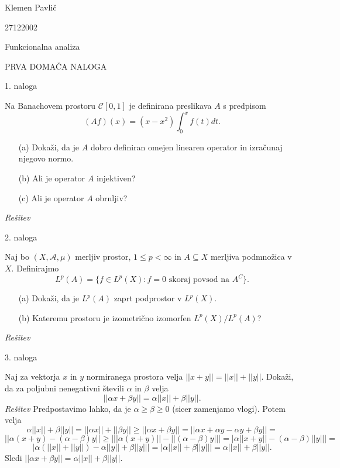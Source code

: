 \documentclass[a4paper, 12pt]{article}
\begin{document}
\begin{flushright}
Klemen Pavlič

27122002
\end{flushright}
\begin{center}
Funkcionalna analiza
\end{center}
\begin{center}
PRVA DOMAČA NALOGA
\end{center}

\begin{flushleft}
1. naloga
\end{flushleft}
Na Banachovem prostoru $\mathcal{C}[0,1]$ je definirana preslikava $A$ s predpisom
$$
(Af)(x) = (x-x^2) \int_{0}^x f(t) dt.
$$
\begin{enumerate}
\item[(a)] Dokaži, da je $A$ dobro definiran omejen linearen operator in izračunaj njegovo normo.
\item[(b)] Ali je operator $A$ injektiven?
\item[(c)] Ali je operator $A$ obrnljiv?
\end{enumerate}
\emph{Rešitev}

\begin{flushleft}
2. naloga
\end{flushleft}
Naj bo $(X,\mathcal{A}, \mu )$ merljiv prostor, $1 \le p < \infty$ in $A\subseteq X$ merljiva podmnožica v $X$. Definirajmo
$$
L^p(A) = \{ f\in L^p(X): f = 0 \textrm{ skoraj povsod na } A^C\}.
$$
\begin{enumerate}
\item[(a)] Dokaži, da je $L^p(A)$ zaprt podprostor v $L^p(X)$.
\item[(b)] Kateremu prostoru je izometrično izomorfen $L^p(X) / L^p(A)$?
\end{enumerate}
\emph{Rešitev}

\begin{flushleft}
3. naloga
\end{flushleft}
Naj za vektorja $x$ in $y$ normiranega prostora velja $|| x+y|| = ||x|| + ||y||$. Dokaži, da za poljubni nenegativni števili $\alpha$ in $\beta$ velja
$$
||\alpha x + \beta y|| = \alpha ||x|| + \beta ||y||.
$$
\emph{Rešitev}
\newline
Predpostavimo lahko, da je $\alpha \ge \beta \ge 0$ (sicer zamenjamo vlogi). Potem velja 
$$
\alpha ||x|| + \beta ||y|| = ||\alpha x|| + ||\beta y|| \ge ||\alpha x + \beta y ||= ||\alpha x + \alpha y - \alpha y + \beta y||=
$$
$$
||\alpha (x+y) - (\alpha - \beta)y|| \ge \Big| ||\alpha(x+y) || - ||(\alpha - \beta)y|| \Big| = \Big| \alpha||x+y|| - (\alpha - \beta) ||y|| \Big|=
$$
$$
\Big| \alpha (||x|| + ||y||) - \alpha ||y|| + \beta ||y||\Big| = \Big| \alpha ||x|| + \beta ||y||\Big| = \alpha ||x|| + \beta ||y||.
$$
Sledi $||\alpha x + \beta y || = \alpha ||x|| + \beta ||y||$.
\end{document}
